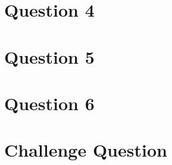 \documentclass{article}[12 pt]
\begin{document}
\section*{Question 4}


\section*{Question 5}


\section*{Question 6}


\section*{Challenge Question}
\end{document}
